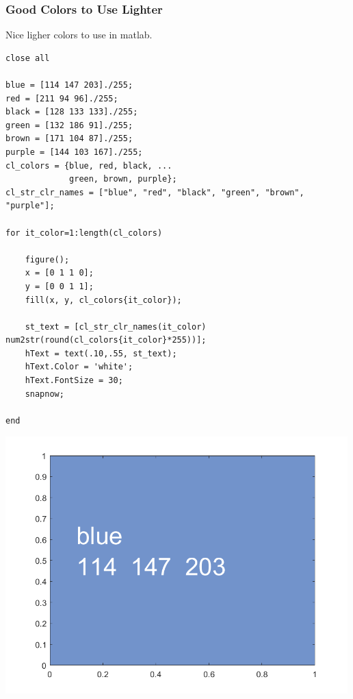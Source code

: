 \documentclass[
]{book}
\begin{document}
\hypertarget{good-colors-to-use-lighter}{%
\subsubsection{Good Colors to Use Lighter}\label{good-colors-to-use-lighter}}

Nice ligher colors to use in matlab.

\begin{verbatim}
close all

blue = [114 147 203]./255;
red = [211 94 96]./255;
black = [128 133 133]./255;
green = [132 186 91]./255;
brown = [171 104 87]./255;
purple = [144 103 167]./255;
cl_colors = {blue, red, black, ...
             green, brown, purple};
cl_str_clr_names = ["blue", "red", "black", "green", "brown", "purple"];

for it_color=1:length(cl_colors)
    
    figure();
    x = [0 1 1 0];
    y = [0 0 1 1];
    fill(x, y, cl_colors{it_color});
    
    st_text = [cl_str_clr_names(it_color) num2str(round(cl_colors{it_color}*255))];
    hText = text(.10,.55, st_text);
    hText.Color = 'white';
    hText.FontSize = 30; 
    snapnow;
    
end
\end{verbatim}

\includegraphics[width=5.20833in,height=\textheight]{img/fs_color_images/figure_6.png}
\end{document}
